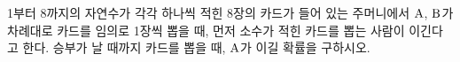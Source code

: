 1부터 8까지의 자연수가 각각 하나씩 적힌 8장의 카드가 들어 있는 주머니에서 $\mathrm{A}$, $\mathrm{B}$가 차례대로 카드를 임의로 1장씩 뽑을 때, 먼저 소수가 적힌 카드를 뽑는 사람이 이긴다고 한다. 승부가 날 때까지 카드를 뽑을 때, $\mathrm{A}$가 이길 확률을 구하시오. 
